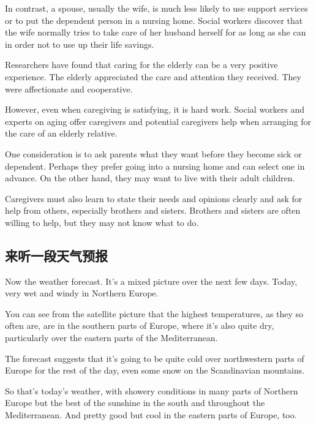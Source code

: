 In contrast, a spouse, usually the wife, is much less likely
to use support services or to put the dependent person in
a nursing home. Social workers discover that the wife
normally tries to take care of her husband herself for as
long as she can in order not to use up their life savings.

Researchers have found that caring for the elderly can be
a very positive experience. The elderly appreciated the
care and attention they received. They were affectionate
and cooperative.

However, even when caregiving is satisfying, it is hard
work. Social workers and experts on aging offer caregivers
and potential caregivers help when arranging for the care
of an elderly relative.

One consideration is to ask parents what they want before
they become sick or dependent. Perhaps they prefer going
into a nursing home and can select one in advance.
On the other hand, they may want to live with their adult
children.

Caregivers must also learn to state their needs and
opinions clearly and ask for help from others, especially
brothers and sisters. Brothers and sisters are often willing to
help, but they may not know what to do.

\subsection{来听一段天气预报}
\begin{margintable}\vspace{-2cm}\footnotesize
\end{margintable}
Now the weather forecast. It's a mixed picture over the
next few days. Today, very wet and windy in Northern Europe.

You can see from the satellite picture that the highest temperatures,
as they so often are, are in the southern
parts of Europe, where it's also quite dry, particularly over
the eastern parts of the Mediterranean.

The forecast suggests that it's going to be quite cold over
northwestern parts of Europe for the rest of the day, even
some snow on the Scandinavian mountains.

So that's today's weather, with showery conditions in many
parts of Northern Europe but the best of the sunshine in the
south and throughout the Mediterranean. And pretty
good but cool in the eastern parts of Europe, too.

